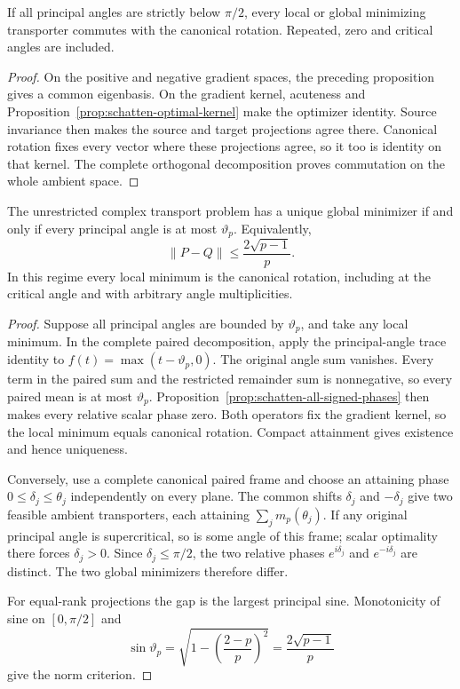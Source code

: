 \begin{corollary}
\label{cor:schatten-acute-canonical-commutation}
If all principal angles are strictly below $\pi/2$, every local or
global minimizing transporter commutes with the canonical rotation.
Repeated, zero and critical angles are included.
\end{corollary}

\begin{proof}
On the positive and negative gradient spaces, the preceding proposition
gives a common eigenbasis. On the gradient kernel, acuteness and
Proposition~\ref{prop:schatten-optimal-kernel} make the optimizer identity.
Source invariance then makes the source and target projections agree
there. Canonical rotation fixes every vector where these projections
agree, so it too is identity on that kernel. The complete orthogonal
decomposition proves commutation on the whole ambient space.
\end{proof}

\begin{corollary}
\label{cor:schatten-unique-minimum}
The unrestricted complex transport problem has a unique global minimizer
if and only if every principal angle is at most $\vartheta_p$.
Equivalently,
\[
 \|P-Q\|\leq\frac{2\sqrt{p-1}}p.
\]
In this regime every local minimum is the canonical rotation, including
at the critical angle and with arbitrary angle multiplicities.
\end{corollary}

\begin{proof}
Suppose all principal angles are bounded by $\vartheta_p$, and take any
local minimum. In the complete paired decomposition, apply the
principal-angle trace identity to $f(t)=\max(t-\vartheta_p,0)$.
The original angle sum vanishes. Every term in the paired sum and the
restricted remainder sum is nonnegative, so every paired mean is at
most $\vartheta_p$. Proposition~\ref{prop:schatten-all-signed-phases}
then makes every relative scalar phase zero. Both operators fix the
gradient kernel, so the local minimum equals canonical rotation.
Compact attainment gives existence and hence uniqueness.

Conversely, use a complete canonical paired frame and choose an attaining
phase $0\leq\delta_j\leq\theta_j$ independently on every plane.
The common shifts $\delta_j$ and $-\delta_j$ give two feasible ambient
transporters, each attaining $\sum_j m_p(\theta_j)$. If any original
principal angle is supercritical, so is some angle of this frame; scalar
optimality there forces $\delta_j>0$. Since $\delta_j\leq\pi/2$, the
two relative phases $e^{i\delta_j}$ and $e^{-i\delta_j}$ are distinct.
The two global minimizers therefore differ.

For equal-rank projections the gap is the largest principal sine.
Monotonicity of sine on $[0,\pi/2]$ and
\[
 \sin\vartheta_p
 =\sqrt{1-\left(\frac{2-p}{p}\right)^2}
 =\frac{2\sqrt{p-1}}p
\]
give the norm criterion.
\end{proof}


